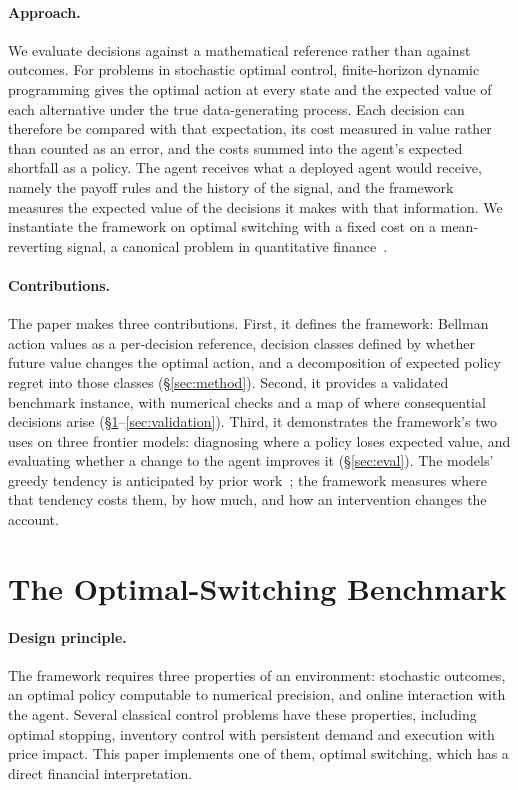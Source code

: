 \documentclass[10pt,a4paper,twocolumn]{article}
\begin{document}
\paragraph{Approach.} We evaluate decisions against a mathematical reference rather than against outcomes. For problems in stochastic optimal control, finite-horizon dynamic programming gives the optimal action at every state and the expected value of each alternative under the true data-generating process. Each decision can therefore be compared with that expectation, its cost measured in value rather than counted as an error, and the costs summed into the agent's expected shortfall as a policy. The agent receives what a deployed agent would receive, namely the payoff rules and the history of the signal, and the framework measures the expected value of the decisions it makes with that information. We instantiate the framework on optimal switching with a fixed cost on a mean-reverting signal, a canonical problem in quantitative finance~\cite{brekke1994,zervos2003,hamadene2007,lyvath2007,leung2015}.

\paragraph{Contributions.} The paper makes three contributions. First, it defines the framework: Bellman action values as a per-decision reference, decision classes defined by whether future value changes the optimal action, and a decomposition of expected policy regret into those classes (\S\ref{sec:method}). Second, it provides a validated benchmark instance, with numerical checks and a map of where consequential decisions arise (\S\ref{sec:bench}--\ref{sec:validation}). Third, it demonstrates the framework's two uses on three frontier models: diagnosing where a policy loses expected value, and evaluating whether a change to the agent improves it (\S\ref{sec:eval}). The models' greedy tendency is anticipated by prior work~\cite{whyreasoningfails}; the framework measures where that tendency costs them, by how much, and how an intervention changes the account.

\section{The Optimal-Switching Benchmark}\label{sec:bench}

\paragraph{Design principle.} The framework requires three properties of an environment: stochastic outcomes, an optimal policy computable to numerical precision, and online interaction with the agent. Several classical control problems have these properties, including optimal stopping, inventory control with persistent demand and execution with price impact. This paper implements one of them, optimal switching, which has a direct financial interpretation.
\end{document}
